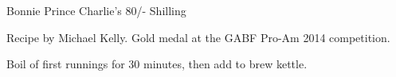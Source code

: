 \documentclass[parskip=half,fontsize=9pt,oneside]{scrbook}
\begin{document}
\mainmatter


\begin{recipe}{Bonnie Prince Charlie's 80/- Shilling}

\begin{aboutblock}
Recipe by Michael Kelly. Gold medal at the GABF Pro-Am 2014 competition.
\sourceaha
\end{aboutblock}


\begin{methodandtiming}

\begin{mashsteps}
\end{mashsteps}

\begin{fermentationsteps}
\end{fermentationsteps}

\begin{directions}
Boil  of first runnings for 30 minutes, then add to brew
kettle.
\end{directions}

\end{methodandtiming}

\recipebreak

\begin{ingredientsblock}

\begin{malts}
\end{malts}

\begin{hops}
\end{hops}


\end{ingredientsblock}

\end{recipe}


\end{document}
